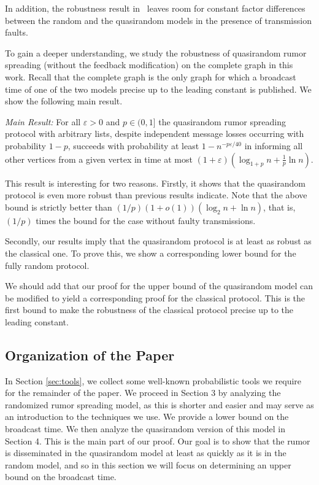 \documentclass[12pt]{article}
\newcommand{\e}{\varepsilon}
\newcommand{\eps}{\varepsilon}
\begin{document}
{In addition, the robustness result in~\cite{DFS09} leaves room for constant factor differences between the random and the quasirandom models in the presence of transmission faults. 

To gain a deeper understanding, we study the robustness of quasirandom rumor spreading (without the feedback modification) on the complete graph in this work. Recall that the complete graph is the only graph for which a broadcast time of one of the two models precise up to 
the leading constant is published. We show the following main result.

\emph{Main Result:} For all $\eps > 0$ and $p \in (0,1]$ the quasirandom rumor spreading protocol with arbitrary lists, despite independent message losses occurring with probability $1-p$, succeeds with probability at least $1 - n^{-p\e/40}$ in  informing all other vertices from a given vertex in time at most $(1 + \eps)(\log_{1+p} n + \frac 1p \ln n)$.


This result is interesting for two reasons. Firstly, it shows that the quasirandom protocol is even more robust than previous results indicate. Note that the above bound is strictly better than $(1/p)(1+o(1))(\log_2 n + \ln n)$, that is, $(1/p)$ times the bound for the case without faulty transmissions.

Secondly, our results imply that the quasirandom protocol is at least as robust as the classical one. To prove this, we show a corresponding lower bound for the fully random protocol. 

We should add that our proof for the upper bound of the quasirandom model can be modified to yield a corresponding proof for the classical protocol. This is the first bound to make the robustness of the classical protocol precise up to the leading constant. 

\subsection{Organization of the Paper}
In Section \ref{sec:tools}, we collect some
well-known probabilistic tools we require for the remainder of the
paper. We proceed in Section 3 by analyzing the randomized rumor spreading model, as this is shorter and easier and may serve as an introduction to the techniques we use. We provide a lower bound on the broadcast time. We then analyze the quasirandom version of this model in Section 4. This is the main part of our proof. Our goal is to show that the rumor is disseminated in the quasirandom model at least as quickly as it is in the random model, and so in this section we will focus on determining an upper bound on the broadcast time.

}
\end{document}
